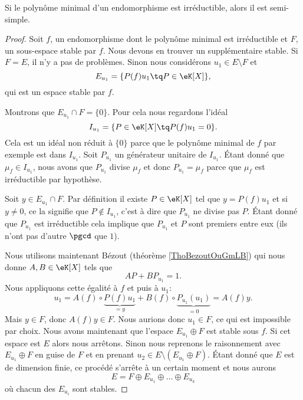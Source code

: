 \begin{lemma}   \label{LemrFINYT}
    Si le polynôme minimal d'un endomorphisme est irréductible, alors il est semi-simple.
\end{lemma}

\begin{proof}
    Soit \( f\), un endomorphisme dont le polynôme minimal est irréductible et \( F\), un sous-espace stable par \( f\). Nous devons en trouver un supplémentaire stable. Si \( F=E\), il n'y a pas de problèmes. Sinon nous considérons \( u_1\in E\setminus F\) et
    \begin{equation}
        E_{u_1}=\{ P(f)u_1\tq P\in \eK[X] \},
    \end{equation}
    qui est un espace stable par \( f\). 

    Montrons que \( E_{u_1}\cap F=\{ 0 \}\). Pour cela nous regardons l'idéal
    \begin{equation}
        I_{u_1}=\{ P\in \eK[X]\tq P(f)u_1=0 \}.
    \end{equation}
    Cela est un idéal non réduit à \( \{ 0 \}\) parce que le polynôme minimal de \( f\) par exemple est dans \( I_{u_1}\). Soit \( P_{u_1}\) un générateur unitaire de \( I_{u_1}\). Étant donné que \( \mu_f\in I_{u_1}\), nous avons que \( P_{u_1}\) divise \( \mu_f\) et donc \( P_{u_1}=\mu_f\) parce que \( \mu_f\) est irréductible par hypothèse.

    Soit \( y\in E_{u_1}\cap F\). Par définition il existe \( P\in\eK[X]\) tel que \( y=P(f)u_1\) et si \( y\neq 0\), ce la signifie que \( P\notin I_{u_1}\), c'est à dire que \( P_{u_1} \) ne divise pas \( P\). Étant donné que \( P_{u_1}\) est irréductible cela implique que \( P_{u_1}\) et \( P\) sont premiers entre eux (ils n'ont pas d'autre \( \pgcd\) que \( 1\)).

    Nous utilisons maintenant Bézout (théorème \ref{ThoBezoutOuGmLB}) qui nous donne \( A,B\in \eK[X]\) tels que 
    \begin{equation}
        AP+BP_{u_1}=1.
    \end{equation}
    Nous appliquons cette égalité à \( f\) et puis à \( u_1\):
    \begin{equation}
        u_1=A(f)\circ \underbrace{P(f)u_1}_{=y}+B(f)\circ \underbrace{P_{u_1}(u_1)}_{=0}=A(f)y.
    \end{equation}
    Mais \( y\in F\), donc \( A(f)y\in F\). Nous aurions donc \( u_1\in F\), ce qui est impossible par choix. Nous avons maintenant que l'espace \( E_{u_1}\oplus F\) est stable sous \( f\). Si cet espace est \( E\) alors nous arrêtons. Sinon nous reprenons le raisonnement avec \( E_{u_1}\oplus F\) en guise de \( F\) et en prenant \( u_2\in E\setminus(E_{u_1}\oplus F)\). Étant donné que \( E\) est de dimension finie, ce procédé s'arrête à un certain moment et nous aurons
    \begin{equation}
        E=F\oplus E_{u_1}\oplus\ldots\oplus E_{u_k}
    \end{equation}
    où chacun des \( E_{u_i}\) sont stables.
\end{proof}

